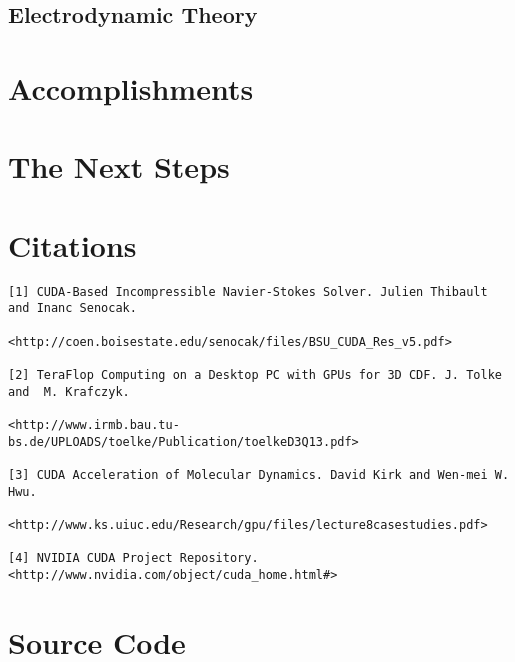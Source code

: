 \documentclass[10pt]{article}
\begin{document}
\subsection{Electrodynamic Theory}

\section{Accomplishments}

\section{The Next Steps}



\section{Citations}


\begin{verbatim}
[1] CUDA-Based Incompressible Navier-Stokes Solver. Julien Thibault and Inanc Senocak.

<http://coen.boisestate.edu/senocak/files/BSU_CUDA_Res_v5.pdf>

[2] TeraFlop Computing on a Desktop PC with GPUs for 3D CDF. J. Tolke and  M. Krafczyk.  

<http://www.irmb.bau.tu-bs.de/UPLOADS/toelke/Publication/toelkeD3Q13.pdf>

[3] CUDA Acceleration of Molecular Dynamics. David Kirk and Wen-mei W. Hwu.  

<http://www.ks.uiuc.edu/Research/gpu/files/lecture8casestudies.pdf>

[4] NVIDIA CUDA Project Repository. <http://www.nvidia.com/object/cuda_home.html#>
\end{verbatim}

\appendix
\section{Source Code}
\end{document}
